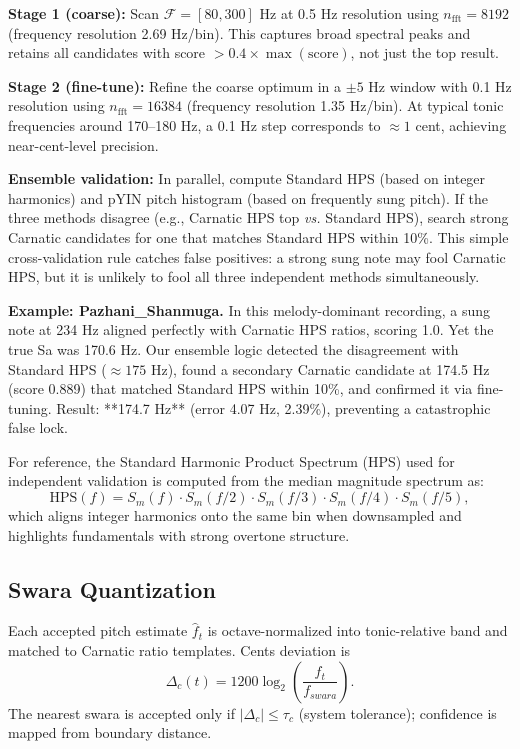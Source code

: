 \documentclass{ieeeaccess}
\begin{document}
\textbf{Stage 1 (coarse):} Scan $\mathcal{F}=[80,300]$ Hz at 0.5 Hz resolution using $n_{\text{fft}}=8192$ (frequency resolution 2.69 Hz/bin). This captures broad spectral peaks and retains all candidates with score $> 0.4 \times \max(\text{score})$, not just the top result.

\textbf{Stage 2 (fine-tune):} Refine the coarse optimum in a $\pm 5$ Hz window with 0.1 Hz resolution using $n_{\text{fft}}=16384$ (frequency resolution 1.35 Hz/bin). At typical tonic frequencies around 170--180 Hz, a 0.1 Hz step corresponds to $\approx 1$ cent, achieving near-cent-level precision.

\textbf{Ensemble validation:} In parallel, compute Standard HPS (based on integer harmonics) and pYIN pitch histogram (based on frequently sung pitch). If the three methods disagree (e.g., Carnatic HPS top \textit{vs.} Standard HPS), search strong Carnatic candidates for one that matches Standard HPS within 10\%. This simple cross-validation rule catches false positives: a strong sung note may fool Carnatic HPS, but it is unlikely to fool all three independent methods simultaneously.

\textbf{Example: Pazhani\_Shanmuga.} In this melody-dominant recording, a sung note at 234 Hz aligned perfectly with Carnatic HPS ratios, scoring 1.0. Yet the true Sa was 170.6 Hz. Our ensemble logic detected the disagreement with Standard HPS ($\approx 175$ Hz), found a secondary Carnatic candidate at 174.5 Hz (score 0.889) that matched Standard HPS within 10\%, and confirmed it via fine-tuning. Result: **174.7 Hz** (error 4.07 Hz, 2.39\%), preventing a catastrophic false lock.

For reference, the Standard Harmonic Product Spectrum (HPS) used for independent validation is computed from the median magnitude spectrum as:
\begin{equation}
\text{HPS}(f)=S_m(f)\cdot S_m(f/2)\cdot S_m(f/3)\cdot S_m(f/4)\cdot S_m(f/5),
\end{equation}
which aligns integer harmonics onto the same bin when downsampled and highlights fundamentals with strong overtone structure.

\subsection{Swara Quantization}
Each accepted pitch estimate $\hat{f}_t$ is octave-normalized into tonic-relative band and matched to Carnatic ratio templates. Cents deviation is
\begin{equation}
\Delta_c(t)=1200\log_2\left(\frac{\hat{f}_t}{f_{swara}}\right).
\end{equation}
The nearest swara is accepted only if $|\Delta_c|\leq\tau_c$ (system tolerance); confidence is mapped from boundary distance.
\end{document}

